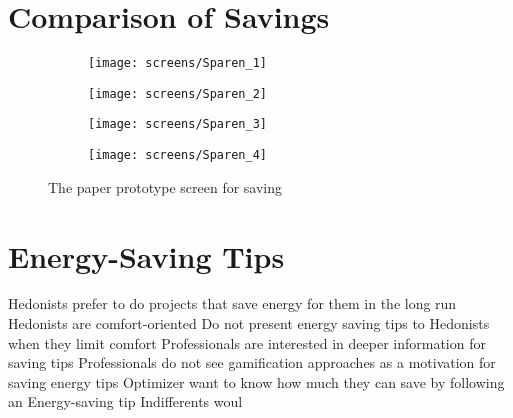 \section{Comparison of Savings}

\begin{figure}[h]
	\centering
	\begin{subfigure}[b]{0.24\columnwidth}
		\centering
		\texttt{[image: screens/Sparen\_1]}
		\label{fig:sparen:professional}
	\end{subfigure}
	\begin{subfigure}[b]{0.24\columnwidth}
		\centering
		\texttt{[image: screens/Sparen\_2]}
		\label{fig:sparen:optimizer}
	\end{subfigure}
	\begin{subfigure}[b]{0.24\columnwidth}
		\centering
		\texttt{[image: screens/Sparen\_3]}
		\label{fig:sparen:indifferent}
	\end{subfigure}
	\begin{subfigure}[b]{0.24\columnwidth}
		\centering
		\texttt{[image: screens/Sparen\_4]}
		\label{fig:sparen:hedonist}
	\end{subfigure}
	\caption{The paper prototype screen for saving}
	\label{fig:sparen} %
\end{figure}

\section{Energy-Saving Tips}

Hedonists prefer to do projects that save energy for them in the long run
Hedonists are comfort-oriented Do not present energy saving tips to Hedonists when they limit comfort
Professionals are interested in deeper information for saving tips
Professionals do not see gamification approaches as a motivation for saving energy tips
Optimizer want to know how much they can save by following an Energy-saving tip
Indifferents woul

